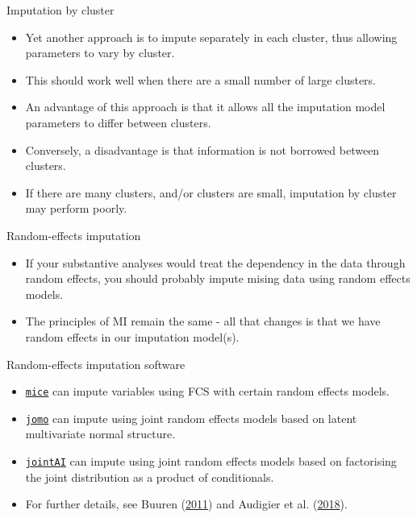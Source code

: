 \documentclass[ignorenonframetext,]{beamer}
\providecommand{\tightlist}{%
  \setlength{\itemsep}{0pt}\setlength{\parskip}{0pt}}
\begin{document}
\begin{frame}{Imputation by cluster}
\protect\hypertarget{imputation-by-cluster}{}

\begin{itemize}
\tightlist
\item
  Yet another approach is to impute separately in each cluster, thus
  allowing parameters to vary by cluster.
\item
  This should work well when there are a small number of large clusters.
\item
  An advantage of this approach is that it allows all the imputation
  model parameters to differ between clusters.
\item
  Conversely, a disadvantage is that information is not borrowed between
  clusters.
\item
  If there are many clusters, and/or clusters are small, imputation by
  cluster may perform poorly.
\end{itemize}

\end{frame}

\begin{frame}{Random-effects imputation}
\protect\hypertarget{random-effects-imputation}{}

\begin{itemize}
\tightlist
\item
  If your substantive analyses would treat the dependency in the data
  through random effects, you should probably impute mising data using
  random effects models.
\item
  The principles of MI remain the same - all that changes is that we
  have random effects in our imputation model(s).
\end{itemize}

\end{frame}

\begin{frame}[fragile]{Random-effects imputation software}
\protect\hypertarget{random-effects-imputation-software}{}

\begin{itemize}
\tightlist
\item
  \href{https://cran.r-project.org/package=mice}{\texttt{mice}} can
  impute variables using FCS with certain random effects models.
\item
  \href{https://cran.r-project.org/package=jomo}{\texttt{jomo}} can
  impute using joint random effects models based on latent multivariate
  normal structure.
\item
  \href{https://cran.r-project.org/package=JointAI}{\texttt{jointAI}}
  can impute using joint random effects models based on factorising the
  joint distribution as a product of conditionals.
\item
  For further details, see Buuren
  (\protect\hyperlink{ref-vanBuuren2011}{2011}) and Audigier et al.
  (\protect\hyperlink{ref-audigier2018multiple}{2018}).
\end{itemize}

\end{frame}
\end{document}
